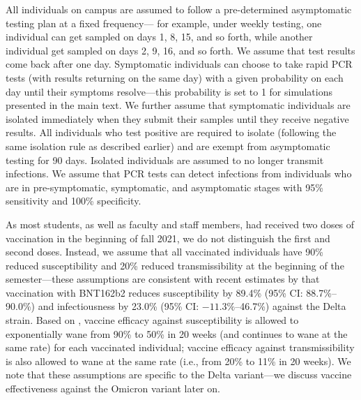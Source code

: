 \documentclass[12pt]{article}
\begin{document}
All individuals on campus are assumed to follow a pre-determined asymptomatic testing plan at a fixed frequency---
for example, under weekly testing, one individual can get sampled on days 1, 8, 15, and so forth, while another individual get sampled on days 2, 9, 16, and so forth.
We assume that test results come back after one day.
Symptomatic individuals can choose to take rapid PCR tests (with results returning on the same day) with a given probability on each day until their symptoms resolve---this probability is set to 1 for simulations presented in the main text.
We further assume that symptomatic individuals are isolated immediately when they submit their samples until they receive negative results.
All individuals who test positive are required to isolate (following the same isolation rule as described earlier) and are exempt from asymptomatic testing for 90 days.
Isolated individuals are assumed to no longer transmit infections.
We assume that PCR tests can detect infections from individuals who are in pre-symptomatic, symptomatic, and asymptomatic stages with 95\% sensitivity and 100\% specificity.

As most students, as well as faculty and staff members, had received two doses of vaccination in the beginning of fall 2021, we do not distinguish the first and second doses.
Instead, we assume that all vaccinated individuals have 90\% reduced susceptibility and 20\% reduced transmissibility at the beginning of the semester---these assumptions are consistent with recent estimates by \cite{prunas2022vaccination} that vaccination with BNT162b2 reduces susceptibility by 89.4\% (95\% CI: 88.7\%--90.0\%) and infectiousness by 23.0\% (95\% CI: $-11.3\%$--46.7\%) against the Delta strain.
Based on \cite{tartof2021effectiveness}, vaccine efficacy against susceptibility is allowed to exponentially wane from 90\% to 50\% in 20 weeks (and continues to wane at the same rate) for each vaccinated individual;
vaccine efficacy against transmissibility is also allowed to wane at the same rate (i.e., from 20\% to 11\% in 20 weeks).
We note that these assumptions are specific to the Delta variant---we discuss vaccine effectiveness against the Omicron variant later on.
\end{document}
